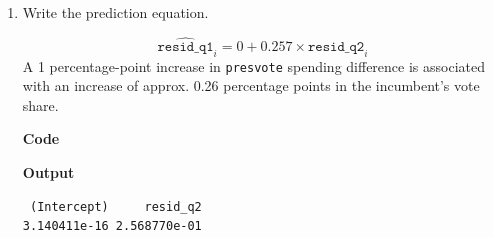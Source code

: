 \documentclass[12pt,letterpaper]{article}
\begin{document}
\begin{enumerate}
		\item Write the prediction equation.
		\vspace{.5cm}

		\[
		\widehat{\texttt{resid\_q1}}_i = 0 + 0.257 \times \texttt{resid\_q2}_i
		\]
		A 1 percentage-point increase in \texttt{presvote} spending difference is associated with an increase of approx. 0.26 percentage points in the incumbent's vote share.
		\vspace{.5cm}

		\textbf{Code}
		
		\vspace{.5cm}
		\textbf{Output}
		\begin{verbatim}
 (Intercept)     resid_q2 
3.140411e-16 2.568770e-01 
		\end{verbatim}
	\end{enumerate}
	
	\newpage	
\end{document}
